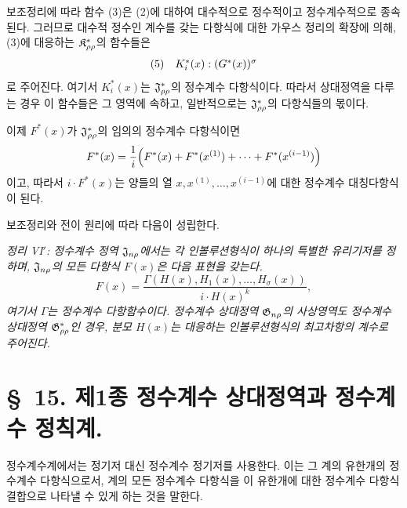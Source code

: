 보조정리에 따라 함수 (3)은 (2)에 대하여 대수적으로 정수적이고 정수계수적으로 종속된다. 그러므로 대수적 정수인 계수를 갖는 다항식에 대한 가우스 정리의 확장에 의해, (3)에 대응하는 $\mathfrak K^*_{\rho\rho}$의 함수들은
\[
\begin{array}{@{}l@{\quad}c@{}}
(5)&
  K_i^*(x):(G^*(x))^\sigma
\end{array}
\]
로 주어진다. 여기서 $K_i^*(x)$는 $\mathfrak J^*_{\rho\rho}$의 정수계수 다항식이다. 따라서 상대정역을 다루는 경우 이 함수들은 그 영역에 속하고, 일반적으로는 $\mathfrak J^*_{\rho\rho}$의 다항식들의 몫이다.

이제 $F^*(x)$가 $\mathfrak J^*_{\rho\rho}$의 임의의 정수계수 다항식이면
\[
  F^*(x)=\frac1i\Bigl(F^*(x)+F^*(x^{(1)})+\cdots+F^*(x^{(i-1)})\Bigr)
\]
이고, 따라서 $i\cdot F^*(x)$는 양들의 열 $x,x^{(1)},\ldots,x^{(i-1)}$에 대한 정수계수 대칭다항식이 된다.

보조정리와 전이 원리에 따라 다음이 성립한다.

\emph{정리 VI$'$: 정수계수 정역 $\mathfrak J_{n\rho}$에서는 각 인볼루션형식이 하나의 특별한 유리기저를 정하며, $\mathfrak J_{n\rho}$의 모든 다항식 $F(x)$은 다음 표현을 갖는다.}
\[
  F(x)=\frac{\Gamma(H(x),H_1(x),\ldots,H_\sigma(x))}{i\cdot H(x)^k},
\]
\emph{여기서 $\Gamma$는 정수계수 다항함수이다. 정수계수 상대정역 $\mathfrak G_{n\rho}$의 사상영역도 정수계수 상대정역 $\mathfrak G^*_{\rho\rho}$인 경우, 분모 $H(x)$는 대응하는 인볼루션형식의 최고차항의 계수로 주어진다.}

\section*{\S\ 15. 제1종 정수계수 상대정역과 정수계수 정칙계.}

정수계수계에서는 정기저 대신 정수계수 정기저를 사용한다. 이는 그 계의 유한개의 정수계수 다항식으로서, 계의 모든 정수계수 다항식을 이 유한개에 대한 정수계수 다항식 결합으로 나타낼 수 있게 하는 것을 말한다.

